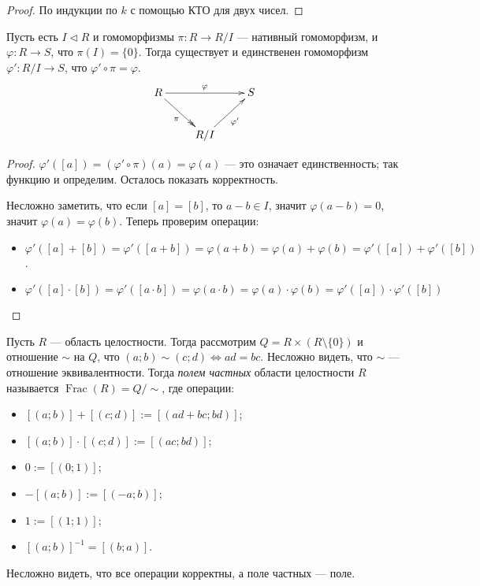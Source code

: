 \documentclass[12pt,a4paper]{article}
\DeclareMathOperator{\Frac}{Frac}
\begin{document}
    \begin{proof}
        По индукции по $k$ с помощью КТО для двух чисел.
    \end{proof}

    \begin{theorem}
        Пусть есть $I \triangleleft R$ и гомоморфизмы $\pi: R \to R/I$ --- нативный гомоморфизм, и $\varphi: R \to S$, что $\pi(I) = \{0\}$. Тогда существует и единственен гомоморфизм $\varphi': R/I \to S$, что $\varphi' \circ \pi = \varphi$.
        \[
            \xymatrix{
                R \ar@{->>}[rd]_{\pi} \ar[rr]^\varphi && S\\
                & R/I \ar[ur]_{\varphi'}
            }
        \]
    \end{theorem}

    \begin{proof}
        $\varphi'([a]) = (\varphi' \circ \pi)(a) = \varphi(a)$ --- это означает единственность; так функцию и определим. Осталось показать корректность.

        Несложно заметить, что если $[a] = [b]$, то $a - b \in I$, значит $\varphi(a - b) = 0$, значит $\varphi(a) = \varphi(b)$. Теперь проверим операции:
        \begin{itemize}
            \item $\varphi'([a] + [b]) = \varphi'([a + b]) = \varphi(a + b) = \varphi(a) + \varphi(b) = \varphi'([a]) + \varphi'([b])$.
            \item $\varphi'([a] \cdot [b]) = \varphi'([a \cdot b]) = \varphi(a \cdot b) = \varphi(a) \cdot \varphi(b) = \varphi'([a]) \cdot \varphi'([b])$
        \end{itemize}
    \end{proof}

    \begin{definition}
        Пусть $R$ --- область целостности. Тогда рассмотрим $Q = R \times (R \setminus \{0\})$ и отношение $\sim$ на $Q$, что $(a; b) \sim (c; d) \Leftrightarrow ad = bc$. Несложно видеть, что $\sim$ --- отношение эквивалентности. Тогда \emph{полем частных} области целостности $R$ называется $\Frac(R) = Q/\sim$, где операции:
        \begin{itemize}
            \item $[(a; b)] + [(c; d)] := [(ad + bc; bd)]$;
            \item $[(a; b)] \cdot [(c; d)] := [(ac; bd)]$;
            \item $0 := [(0; 1)]$;
            \item $- [(a; b)] := [(-a; b)]$;
            \item $1 := [(1; 1)]$;
            \item $[(a; b)]^{-1} = [(b; a)]$.
        \end{itemize}
        Несложно видеть, что все операции корректны, а поле частных --- поле.
    \end{definition}
\end{document}
